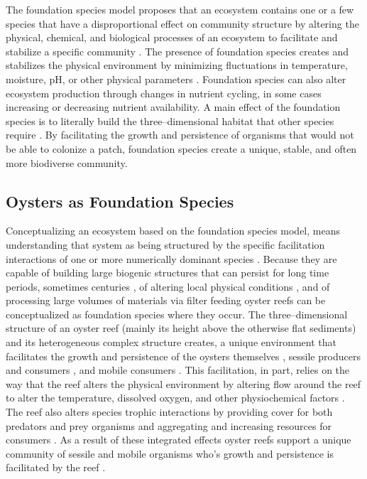 \documentclass{article}
\begin{document}
The foundation species model proposes that an ecosystem contains one or a few species that have a disproportional effect on community structure by altering the physical, chemical, and biological processes of an ecosystem to facilitate and stabilize a specific community \cite{fields_foundation_2022}. The presence of foundation species creates and stabilizes the physical environment by minimizing fluctuations in temperature, moisture, pH, or other physical parameters \cite{ellison_loss_2005}. Foundation species can also alter ecosystem production through changes in nutrient cycling, in some cases increasing \cite{fields_foundation_2022} or decreasing \cite{ellison_loss_2005} nutrient availability. A main effect of the foundation species is to literally build the three--dimensional habitat that other species require \cite{angelini_interactions_2011}. By facilitating the growth and persistence of organisms that would not be able to colonize a patch, foundation species create a unique, stable, and often more biodiverse community. 

\subsection{Oysters as Foundation Species}

Conceptualizing an ecosystem based on the foundation species model, means understanding that system as being structured by the specific facilitation interactions of one or more numerically dominant species \cite{dayton_toward_1972, ellison_loss_2005, angelini_interactions_2011}. Because they are capable of building large biogenic structures that can persist for long time periods, sometimes centuries \cite{lockwood_conservation_2019}, of altering local physical conditions \cite{lenihan_physicalbiological_1999}, and of processing large volumes of materials via filter feeding \cite{newell_ecological_1988} oyster reefs can be conceptualized as foundation species where they occur. The three--dimensional structure of an oyster reef (mainly its height above the otherwise flat sediments) and its heterogeneous complex structure creates, a unique environment that facilitates the growth and persistence of the oysters themselves \cite{lenihan_physicalbiological_1999}, sessile producers and consumers \cite{}, and mobile consumers \cite{smith_restored_2022, searles_oyster_2022}. This facilitation, in part, relies on the way that the reef alters the physical environment by altering flow around the reef to alter the temperature, dissolved oxygen, and other physiochemical factors \cite{lenihan_physicalbiological_1999}. The reef also alters species trophic interactions by providing cover for both predators and prey organisms \cite{smith_restored_2022} and aggregating and increasing resources for consumers \cite{newell_ecological_1988}. As a result of these integrated effects oyster reefs support a unique community of sessile and mobile organisms who's growth and persistence is facilitated by the reef \cite{lenihan_physicalbiological_1999, smith_restored_2022}. 
\end{document}
